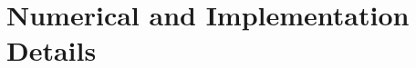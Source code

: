 \documentclass[12pt,a4paper]{article}
\begin{document}

\section{Numerical and Implementation Details}
\label{sec:technical-details}
\end{document}
